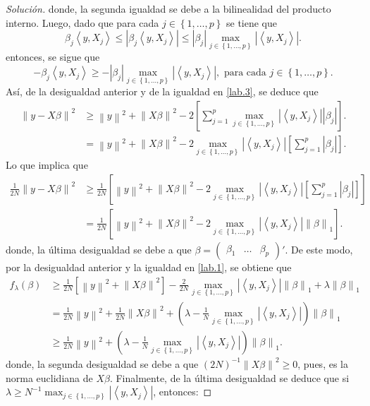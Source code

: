 \documentclass[10.5pt,notitlepage]{article}
\newenvironment{solucion}
  {\begin{proof}[Solución]}
  {\end{proof}}
\newcommand{\abs}[1]{\left\lvert #1 \right\rvert}
\newcommand{\norm}[1]{\left\| #1 \right\|}
\newcommand{\inner}[1]{\left\langle #1 \right\rangle}
\newcommand{\corch}[1]{\left[ #1 \right]}
\newcommand{\kis}[1]{\left\{ #1 \right\}}
\newcommand{\pare}[1]{\left( #1 \right)}
\newcommand{\Matrix}[1]{\begin{pmatrix} #1 \end{pmatrix}}
\theoremstyle{plain}
\begin{document}
\begin{solucion}
donde, la segunda igualdad se debe a la bilinealidad del producto interno. Luego, dado que para cada \(j \in \kis{1, \hdots, p}\) se tiene que
\[
\beta_{j}\inner{y,X_{j}} \leq \abs{\beta_{j}\inner{y,X_{j}}} \leq \abs{\beta_j} \max_{j \in \kis{1,\hdots,p}}\abs{\inner{y,X_{j}}}.
\]
entonces, se sigue que
\[
-\beta_{j}\inner{y,X_{j}} \geq -\abs{\beta_j} \max_{j \in \kis{1,\hdots,p}}\abs{\inner{y,X_{j}}}, \text{ para cada } j \in \kis{1, \hdots,p}.
\]
Así, de la desigualdad anterior y de la igualdad en \eqref{lab.3}, se deduce que 
\begin{align*}
    \norm{y - X\beta}^2 &\geq \norm{y}^2 + \norm{X \beta}^2  - 2\corch{\sum_{j = 1}^{p}\max_{j \in \kis{1,\hdots,p}}\abs{\inner{y,X_{j}}}\abs{\beta_j}}.\\
                        &= \norm{y}^2 + \norm{X \beta}^2  - 2\max_{j \in \kis{1,\hdots,p}}\abs{\inner{y,X_{j}}}\corch{\sum_{j = 1}^{p}\abs{\beta_j}}.
\end{align*}
Lo que implica que 
\begin{align*}
\frac{1}{2N}\norm{y - X\beta}^2 &\geq \frac{1}{2N}\corch{\norm{y}^2 + \norm{X \beta}^2 -2\max_{j \in \kis{1,\hdots,p}}\abs{\inner{y,X_{j}}}\corch{\sum_{j = 1}^{p}\abs{\beta_j}}} \nonumber\\ 
                                &=\frac{1}{2N}\corch{\norm{y}^2 + \norm{X \beta}^2 -2\max_{j \in \kis{1,\hdots,p}}\abs{\inner{y,X_{j}}}\norm{\beta}_1}.    
\end{align*}
donde, la última desigualdad se debe a que \(\beta = \Matrix{\beta_1 & \hdots & \beta_p}'\). De este modo, por la desigualdad anterior y la igualdad en \eqref{lab.1}, se obtiene que
\begin{align*}
f_{\lambda}(\beta) &\geq  \frac{1}{2N}\corch{\norm{y}^2 + \norm{X \beta}^2} -\frac{2}{2N}\max_{j \in \kis{1,\hdots,p}}\abs{\inner{y,X_{j}}}\norm{\beta}_1 + \lambda \norm{\beta}_1\\
                   &= \frac{1}{2N}\norm{y}^2 + \frac{1}{2N}\norm{X \beta}^2 + \pare{\lambda  -\frac{1}{N}\max_{j \in \kis{1,\hdots,p}}\abs{\inner{y,X_{j}}}}\norm{\beta}_1\\ 
                   &\geq  \frac{1}{2N}\norm{y}^2 + \pare{\lambda  -\frac{1}{N}\max_{j \in \kis{1,\hdots,p}}\abs{\inner{y,X_{j}}}}\norm{\beta}_1.
\end{align*}
donde, la segunda desigualdad se debe a que \((2N)^{-1}\norm{X \beta}^2 \geq 0\), pues, es la norma euclidiana de \(X \beta\). Finalmente, de la última desigualdad se deduce que si \(\lambda \geq N^{-1}\max_{j \in \kis{1,\hdots,p}}\abs{\inner{y,X_{j}}}\), entonces: 

\end{solucion}
\end{document}
